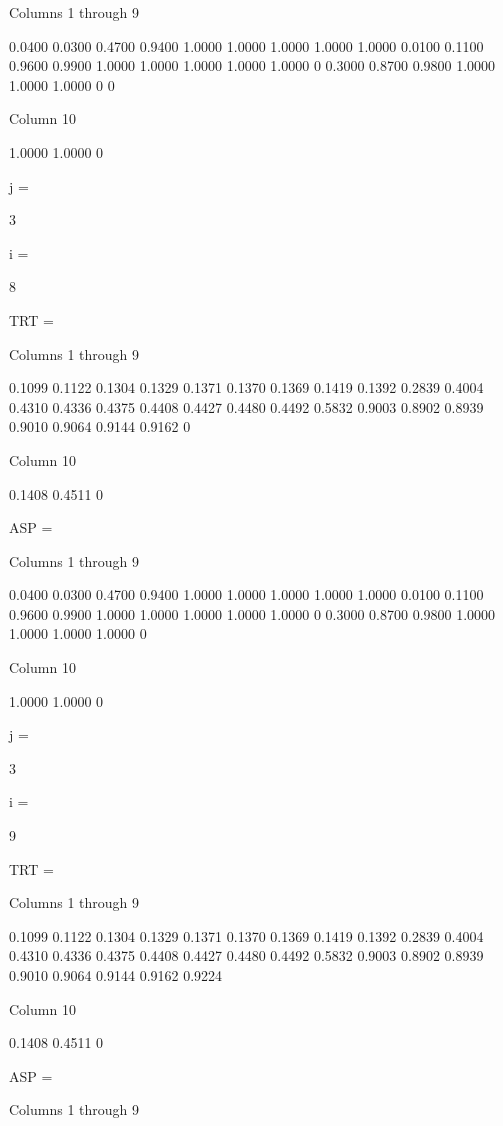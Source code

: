   Columns 1 through 9

    0.0400    0.0300    0.4700    0.9400    1.0000    1.0000    1.0000    1.0000    1.0000
    0.0100    0.1100    0.9600    0.9900    1.0000    1.0000    1.0000    1.0000    1.0000
         0    0.3000    0.8700    0.9800    1.0000    1.0000    1.0000         0         0

  Column 10

    1.0000
    1.0000
         0


j =

     3


i =

     8


TRT =

  Columns 1 through 9

    0.1099    0.1122    0.1304    0.1329    0.1371    0.1370    0.1369    0.1419    0.1392
    0.2839    0.4004    0.4310    0.4336    0.4375    0.4408    0.4427    0.4480    0.4492
    0.5832    0.9003    0.8902    0.8939    0.9010    0.9064    0.9144    0.9162         0

  Column 10

    0.1408
    0.4511
         0


ASP =

  Columns 1 through 9

    0.0400    0.0300    0.4700    0.9400    1.0000    1.0000    1.0000    1.0000    1.0000
    0.0100    0.1100    0.9600    0.9900    1.0000    1.0000    1.0000    1.0000    1.0000
         0    0.3000    0.8700    0.9800    1.0000    1.0000    1.0000    1.0000         0

  Column 10

    1.0000
    1.0000
         0


j =

     3


i =

     9


TRT =

  Columns 1 through 9

    0.1099    0.1122    0.1304    0.1329    0.1371    0.1370    0.1369    0.1419    0.1392
    0.2839    0.4004    0.4310    0.4336    0.4375    0.4408    0.4427    0.4480    0.4492
    0.5832    0.9003    0.8902    0.8939    0.9010    0.9064    0.9144    0.9162    0.9224

  Column 10

    0.1408
    0.4511
         0


ASP =

  Columns 1 through 9

